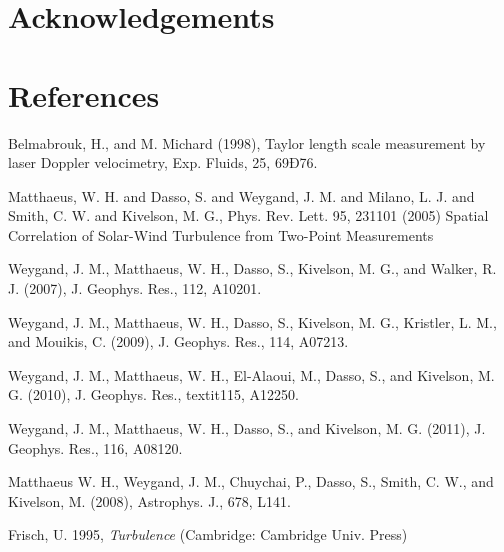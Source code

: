 \documentclass[aip,prl,amsmath,amssymb,reprint,superscriptaddress]{revtex4-1} %
\begin{document}
\section*{Acknowledgements}
\section*{References}
\begin{thebibliography}{99}

Belmabrouk, H., and M. Michard (1998), Taylor length scale measurement
by laser Doppler velocimetry, Exp. Fluids, 25, 69Ð76.

Matthaeus, W. H. and Dasso, S. and Weygand, J. M. and Milano, L. J. and Smith, C. W. and Kivelson, M. G., Phys. Rev. Lett. 95, 231101 (2005) Spatial Correlation of Solar-Wind Turbulence from Two-Point Measurements

Weygand, J. M., Matthaeus, W. H., Dasso, S., Kivelson, M. G.,
and Walker, R. J. (2007), J. Geophys. Res., 112, A10201.

Weygand, J. M., Matthaeus, W. H., Dasso, S., Kivelson, M. G.,
Kristler, L. M., and Mouikis, C. (2009), J. Geophys. Res., 114,
A07213.

Weygand, J. M., Matthaeus, W. H., El-Alaoui, M., Dasso, S., and
Kivelson, M. G. (2010), J. Geophys. Res., textit115, A12250.

Weygand, J. M., Matthaeus, W. H., Dasso, S., and Kivelson, M.
G. (2011), J. Geophys. Res., 116, A08120.

Matthaeus W. H., Weygand, J. M., Chuychai, P., Dasso, S.,
Smith, C. W., and Kivelson, M. (2008), Astrophys. J., 678,
L141.

Frisch, U. 1995, {\it Turbulence} (Cambridge: Cambridge Univ. Press)



\end{thebibliography}
\end{document}
